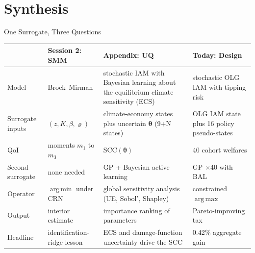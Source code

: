 \documentclass[10pt,aspectratio=169]{beamer}
\DeclareMathOperator*{\argmin}{arg\,min}
\DeclareMathOperator*{\argmax}{arg\,max}
\begin{document}
\section{Synthesis}

\begin{frame}{One Surrogate, Three Questions}
\scriptsize
\begin{center}
\begin{tabular}{p{}p{}p{}p{}}
\toprule
 & \textbf{Session 2: SMM} & \textbf{Appendix: UQ} & \textbf{Today: Design} \\
\midrule
Model & Brock--Mirman & stochastic IAM with Bayesian learning about the equilibrium climate sensitivity (ECS) & stochastic OLG IAM with tipping risk \\
Surrogate inputs & $(z, K, \beta, \varrho)$ & climate-economy states plus uncertain $\bm{\theta}$ (9+N states) & OLG IAM state plus 16 policy pseudo-states \\
QoI & moments $m_1$ to $m_3$ & $\mathrm{SCC}(\bm{\theta})$ & 40 cohort welfares \\
Second surrogate & none needed & GP + Bayesian active learning & GP $\times 40$ with BAL \\
Operator & $\argmin$ under CRN & global sensitivity analysis (UE, Sobol', Shapley) & constrained $\argmax$ \\
Output & interior estimate & importance ranking of parameters & Pareto-improving tax \\
Headline & identification-ridge lesson & ECS and damage-function uncertainty drive the SCC & 0.42\% aggregate gain \\
\bottomrule
\end{tabular}
\end{center}
\end{frame}
\end{document}
